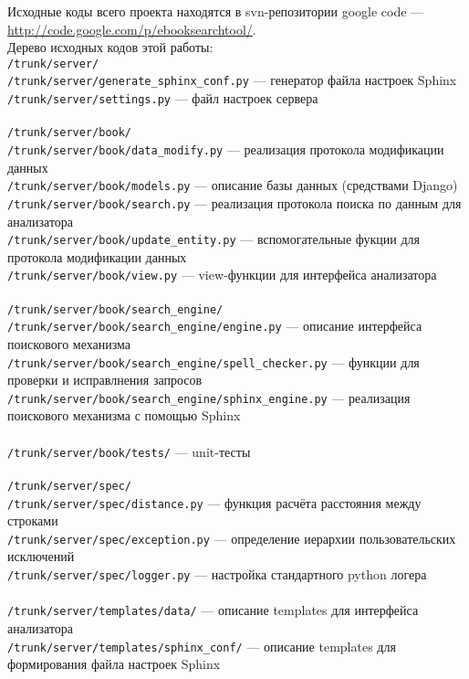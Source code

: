 \documentclass[a4paper,12pt]{article}
\begin{document}
{\small

Исходные коды всего проекта находятся в svn-репозитории google code ---\\ 
\url{http://code.google.com/p/ebooksearchtool/}.
\\

Дерево исходных кодов этой работы:
\\
{\tt /trunk/server/} \\
{\tt /trunk/server/generate\_sphinx\_conf.py} --- генератор файла настроек Sphinx \\
{\tt /trunk/server/settings.py} --- файл настроек сервера \\
\\
{\tt /trunk/server/book/} \\
{\tt /trunk/server/book/data\_modify.py} --- реализация протокола модификации данных \\
{\tt /trunk/server/book/models.py} --- описание базы данных (средствами Django) \\
{\tt /trunk/server/book/search.py} --- реализация протокола поиска по данным для анализатора \\
{\tt /trunk/server/book/update\_entity.py} --- вспомогательные фукции для протокола модификации данных \\
{\tt /trunk/server/book/view.py} --- view-функции для интерфейса анализатора \\
\\
{\tt /trunk/server/book/search\_engine/} \\
{\tt /trunk/server/book/search\_engine/engine.py} --- описание интерфейса поискового механизма \\
{\tt /trunk/server/book/search\_engine/spell\_checker.py} --- функции для проверки и исправлнения запросов \\
{\tt /trunk/server/book/search\_engine/sphinx\_engine.py} --- реализация поискового механизма с помощью Sphinx \\
\\
{\tt /trunk/server/book/tests/} --- unit-тесты \\
\\
{\tt /trunk/server/spec/} \\
{\tt /trunk/server/spec/distance.py} --- функция расчёта расстояния между строками \\
{\tt /trunk/server/spec/exception.py} --- определение иерархии пользовательских исключений \\
{\tt /trunk/server/spec/logger.py} --- настройка стандартного python логера \\
\\
{\tt /trunk/server/templates/data/} --- описание templates для интерфейса анализатора \\
{\tt /trunk/server/templates/sphinx\_conf/} --- описание templates для формирования файла настроек Sphinx \\
}
\end{document}
